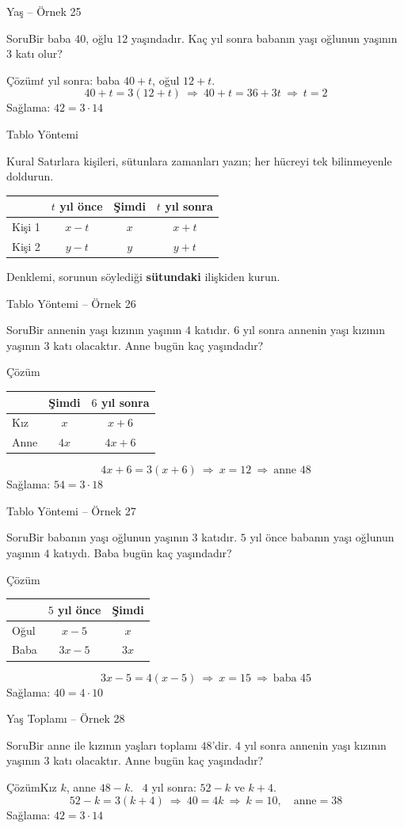 \documentclass[aspectratio=169,11pt]{beamer}
\newcommand{\soru}[3]{%
\begin{frame}{#1}
  \begin{block}{Soru}\large #2\end{block}
  \pause
  \begin{exampleblock}{Çözüm}\large #3\end{exampleblock}
\end{frame}}
\begin{document}
\soru{Yaş -- Örnek 25}
{Bir baba \(40\), oğlu \(12\) yaşındadır. Kaç yıl sonra babanın yaşı oğlunun yaşının \(3\) katı olur?}
{\(t\) yıl sonra: baba \(40+t\), oğul \(12+t\).
\[40+t=3(12+t)\ \Rightarrow\ 40+t=36+3t\ \Rightarrow\ t=2\]
Sağlama: \(42=3\cdot 14\) \checkmark}

\begin{frame}{Tablo Yöntemi}
\begin{block}{Kural}
Satırlara kişileri, sütunlara zamanları yazın; her hücreyi tek bilinmeyenle doldurun.
\begin{center}
\renewcommand{\arraystretch}{1.25}
\begin{tabular}{lccc}
\toprule
 & \(t\) yıl önce & Şimdi & \(t\) yıl sonra\\\midrule
Kişi 1 & \(x-t\) & \(x\) & \(x+t\)\\
Kişi 2 & \(y-t\) & \(y\) & \(y+t\)\\\bottomrule
\end{tabular}
\end{center}
Denklemi, sorunun söylediği \textbf{sütundaki} ilişkiden kurun.
\end{block}
\end{frame}

\soru{Tablo Yöntemi -- Örnek 26}
{Bir annenin yaşı kızının yaşının \(4\) katıdır. \(6\) yıl sonra annenin yaşı kızının yaşının \(3\) katı olacaktır. Anne bugün kaç yaşındadır?}
{\begin{tabular}{lcc}
 & Şimdi & \(6\) yıl sonra\\\hline
Kız & \(x\) & \(x+6\)\\
Anne & \(4x\) & \(4x+6\)
\end{tabular}
\[4x+6=3(x+6)\ \Rightarrow\ x=12\ \Rightarrow\ \text{anne } 48\]
Sağlama: \(54=3\cdot 18\) \checkmark}

\soru{Tablo Yöntemi -- Örnek 27}
{Bir babanın yaşı oğlunun yaşının \(3\) katıdır. \(5\) yıl önce babanın yaşı oğlunun yaşının \(4\) katıydı. Baba bugün kaç yaşındadır?}
{\begin{tabular}{lcc}
 & \(5\) yıl önce & Şimdi\\\hline
Oğul & \(x-5\) & \(x\)\\
Baba & \(3x-5\) & \(3x\)
\end{tabular}
\[3x-5=4(x-5)\ \Rightarrow\ x=15\ \Rightarrow\ \text{baba } 45\]
Sağlama: \(40=4\cdot 10\) \checkmark}

\soru{Yaş Toplamı -- Örnek 28}
{Bir anne ile kızının yaşları toplamı \(48\)'dir. \(4\) yıl sonra annenin yaşı kızının yaşının \(3\) katı olacaktır. Anne bugün kaç yaşındadır?}
{Kız \(k\), anne \(48-k\). \ \(4\) yıl sonra: \(52-k\) ve \(k+4\).
\[52-k=3(k+4)\ \Rightarrow\ 40=4k\ \Rightarrow\ k=10,\quad \text{anne}=38\]
Sağlama: \(42=3\cdot 14\) \checkmark}
\end{document}
